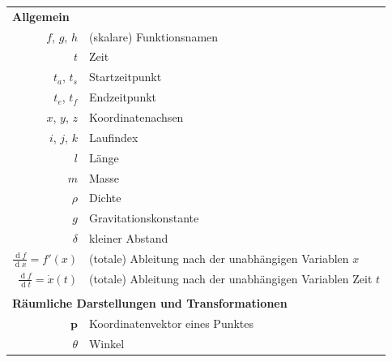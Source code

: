 \documentclass[a4paper, 11pt, accentcolor = tud3b]{tudreport}
\DeclareMathOperator{\total}{d}
\renewcommand{\vec}[1]{\boldsymbol{\mathbf{#1}}}
\begin{document}
		\begin{table}
			\centering
			\begin{tabular}{rl}
				\multicolumn{2}{l}{\textbf{Allgemein}}                                                                       \\
				                         \(f\), \(g\), \(h\) & (skalare) Funktionsnamen                                      \\
				                                       \(t\) & Zeit                                                          \\
				                            \(t_a\), \(t_s\) & Startzeitpunkt                                                \\
				                            \(t_e\), \(t_f\) & Endzeitpunkt                                                  \\
				                         \(x\), \(y\), \(z\) & Koordinatenachsen                                             \\
				                         \(i\), \(j\), \(k\) & Laufindex                                                     \\
				                                       \(l\) & Länge                                                         \\
				                                       \(m\) & Masse                                                         \\
				                                    \(\rho\) & Dichte                                                        \\
				                                       \(g\) & Gravitationskonstante                                         \\
				                                  \(\delta\) & kleiner Abstand                                               \\
				     \( \frac{\total f}{\total x} = f'(x) \) & (totale) Ableitung nach der unabhängigen Variablen \(x\)      \\
				\( \frac{\total f}{\total t} = \dot{x}(t) \) & (totale) Ableitung nach der unabhängigen Variablen Zeit \(t\) \\&\\
			\multicolumn{2}{l}{\textbf{Räumliche Darstellungen und Transformationen}} \\
				                \(\vec{p}\) & Koordinatenvektor eines Punktes \\
				                 \(\theta\) & Winkel                          \\

\end{tabular}
\end{table}
\end{document}
